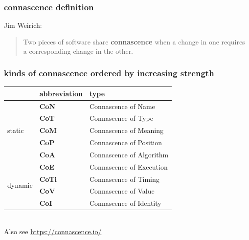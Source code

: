\documentclass[aspectratio=169,12pt,xcolor=dvipsnames]{beamer}
\begin{document}
\begin{frame}
  \frametitle{connascence definition}
  Jim Weirich:\bigskip\\
  \begin{quote}
    Two pieces of software share \textbf{connascence} when a change in one requires a corresponding change in the other.
  \end{quote}
\end{frame}

\begin{frame}
  \frametitle{kinds of connascence ordered by increasing strength}
  \begin{center}
    \begin{tabular}{|l|l|l|}\hline
      & \textbf{abbreviation}  & \textbf{type} \\\hline
      \multirow{5}{*}{static}  & \textbf{CoN}  & Connascence of Name\\
      & \textbf{CoT}  & Connascence of Type\\
      & \textbf{CoM}  & Connascence of Meaning\\
      & \textbf{CoP}  & Connascence of Position\\
      & \textbf{CoA}  & Connascence of Algorithm\\\hline
      \multirow{4}{*}{dynamic} & \textbf{CoE}  & Connascence of Execution\\
      & \textbf{CoTi} & Connascence of Timing\\
      & \textbf{CoV}  & Connascence of Value\\
      & \textbf{CoI}  & Connascence of Identity\\\hline
    \end{tabular}\\\bigskip
    Also see \url{https://connascence.io/}
  \end{center}
\end{frame}


\end{document}
